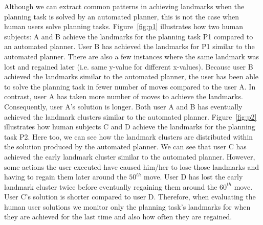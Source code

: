 Although we can extract common patterns in achieving landmarks when the planning task is solved by an automated planner, this is not the case when human users solve planning tasks.
Figure~\ref{fig:p1} illustrates how two human subjects: A and B achieve the landmarks for the planning task P1 compared to an automated planner.
User B has achieved the landmarks for P1 similar to the automated planner.
There are also a few instances where the same landmark was lost and regained later (i.e. same y-value for different x-values).
Because user B achieved the landmarks similar to the automated planner, the user has been able to solve the planning task in fewer number of moves compared to the user A.
In contrast, user A has taken more number of moves to achieve the landmarks.
Consequently, user A's solution is longer.
Both user A and B has eventually achieved the landmark clusters similar to the automated planner.
Figure~\ref{fig:p2} illustrates how human subjects C and D achieve the landmarks for the planning task P2.
Here too, we can see how the landmark clusters are distributed within the solution produced by the automated planner.
We can see that user C has achieved the early landmark cluster similar to the automated planner.
However, some actions the user executed have caused him/her to lose those landmarks and having to regain them later around the $50^{th}$ move.
User D has lost the early landmark cluster twice before eventually regaining them around the $60^{th}$ move.
User C's solution is shorter compared to user D.
Therefore, when evaluating the human user solutions we monitor only the planning task's landmarks for when they are achieved for the last time and also how often they are regained.

